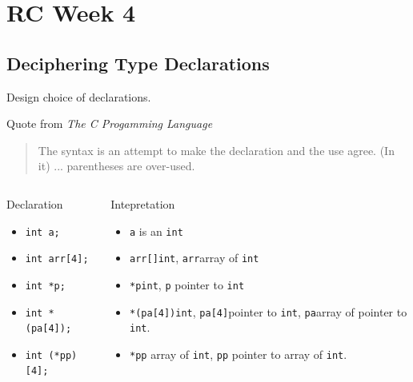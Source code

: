 \section{RC Week 4}
\subsection{Deciphering Type Declarations}
\begin{frame}{Design choice of declarations.}
\begin{block}{Quote from \textit{The C Progamming Language}}
	\begin{quotation}
		The syntax is an attempt to make the declaration and the use agree. (In it) ... parentheses are over-used.
	\end{quotation}
\end{block}
\vspace{-.35in}
\begin{columns}
	\begin{block}{Declaration}
		\begin{itemize}
			\item \texttt{int a;}
			\item \texttt{int arr[4];}
			\item \texttt{int *p;}
			\item \texttt{int *(pa[4]);\newline}
			\item \texttt{int (*pp)[4];}
		\end{itemize}
	\end{block}
	\begin{block}{Intepretation}
		\begin{itemize}
			\item \texttt{a} is an \texttt{int}
			\item \texttt{arr[]}\textrightarrow \texttt{int}, \texttt{arr}\textrightarrow array of \texttt{int}
			\item  \texttt{*p}\textrightarrow \texttt{int}, \texttt{p} \textrightarrow pointer to \texttt{int}
			\item \texttt{*(pa[4])}\textrightarrow \texttt{int}, \texttt{pa[4]}\textrightarrow pointer to \texttt{int},  \texttt{pa}\textrightarrow array of pointer to \texttt{int}.
			\item \texttt{*pp} \textrightarrow array of \texttt{int}, \texttt{pp} \textrightarrow pointer to array of \texttt{int}.
		\end{itemize}
	\end{block}
\end{columns}
\end{frame}

